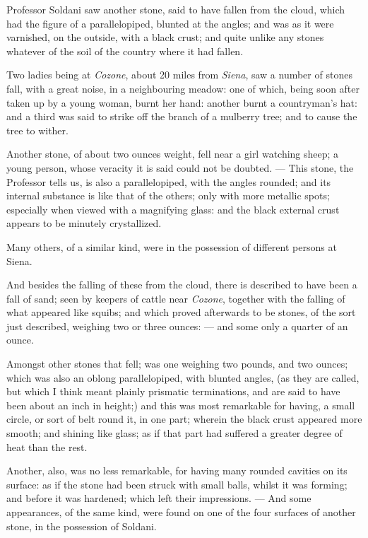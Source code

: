 \documentclass[a4paper, 12pt, oneside, twocolumn]{article}
\begin{document}
Professor Soldani saw another stone, said to have fallen from the cloud, which had the figure of a parallelopiped, blunted at the angles; and was as it were varnished, on the outside, with a black crust; and quite unlike any stones whatever of the soil of the country where it had fallen.

Two ladies being at \emph{Cozone}, about 20 miles from \emph{Siena}, saw a number of stones fall, with a great noise, in a neighbouring meadow: one of which, being soon after taken up by a young woman, burnt her hand: another burnt a countryman's hat: and a third was said to strike off the branch of a mulberry tree; and to cause the tree to wither.

Another stone, of about two ounces weight, fell near a girl watching sheep; a young person, whose veracity it is said could not be doubted. --- This stone, the Professor tells us, is also a parallelopiped, with the angles rounded; and its internal substance is like that of the others; only with more metallic spots; especially when viewed with a magnifying glass: and the black external crust appears to be minutely crystallized.

Many others, of a similar kind, were in the possession of different persons at Siena.

And besides the falling of these from the cloud, there is described to have been a fall of sand; seen by keepers of cattle near \emph{Cozone}, together with the falling of what appeared like squibs; and which proved afterwards to be stones, of the sort just described, weighing two or three ounces: --- and some only a quarter of an ounce.

Amongst other stones that fell; was one weighing two pounds, and two ounces; which was also an oblong parallelopiped, with blunted angles, (as they are called, but which I think meant plainly prismatic terminations, and are said to have been about an inch in height;) and this was most remarkable for having, a small circle, or sort of belt round it, in one part; wherein the black crust appeared more smooth; and shining like glass; as if that part had suffered a greater degree of heat than the rest.

Another, also, was no less remarkable, for having many rounded cavities on its surface: as if the stone had been struck with small balls, whilst it was forming; and before it was hardened; which left their impressions. --- And some appearances, of the same kind, were found on one of the four surfaces of another stone, in the possession of Soldani.
\end{document}
